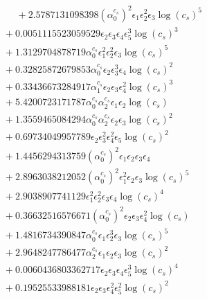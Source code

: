 \documentclass[10pt]{article}
\begin{document}
\begin{align*}
\phantom{F_{s,6}} &\phantom{={}}{}  + 2.5787131098398 \left(\alpha_{0}^{c_s}\right)^{2} \epsilon_{1} \epsilon_{2}^{2} \epsilon_{3} \log{\left(c_{s} \right)}^{5} \\
&{}  + 0.0051115523059529 \epsilon_{2} \epsilon_{3} \epsilon_{4} \epsilon_{5}^{3} \log{\left(c_{s} \right)}^{3} \\
&{}  + 1.3129704878719 \alpha_{0}^{c_s} \epsilon_{1}^{2} \epsilon_{2}^{2} \epsilon_{3} \log{\left(c_{s} \right)}^{5} \\
&{}  + 0.32825872679853 \alpha_{0}^{c_s} \epsilon_{2} \epsilon_{3}^{3} \epsilon_{4} \log{\left(c_{s} \right)}^{2} \\
&{}  + 0.33436673284917 \alpha_{1}^{c_s} \epsilon_{2} \epsilon_{3} \epsilon_{4}^{2} \log{\left(c_{s} \right)}^{3} \\
&{}  + 5.4200723171787 \alpha_{0}^{c_s} \alpha_{2}^{c_s} \epsilon_{1} \epsilon_{2} \log{\left(c_{s} \right)} \\
&{}  + 1.3559465084294 \alpha_{0}^{c_s} \alpha_{2}^{c_s} \epsilon_{2} \epsilon_{3} \log{\left(c_{s} \right)}^{2} \\
&{}  + 0.69734049957789 \epsilon_{2} \epsilon_{3}^{2} \epsilon_{4}^{2} \epsilon_{5} \log{\left(c_{s} \right)}^{2} \\
&{}  + 1.4456294313759 \left(\alpha_{0}^{c_s}\right)^{2} \epsilon_{1} \epsilon_{2} \epsilon_{3} \epsilon_{4} \\
&{}  + 2.8963038212052 \left(\alpha_{0}^{c_s}\right)^{2} \epsilon_{1}^{2} \epsilon_{2} \epsilon_{3} \log{\left(c_{s} \right)}^{5} \\
&{}  + 2.9038907741129 \epsilon_{1}^{2} \epsilon_{2}^{2} \epsilon_{3} \epsilon_{4} \log{\left(c_{s} \right)}^{4} \\
&{}  + 0.36632516576671 \left(\alpha_{0}^{c_s}\right)^{2} \epsilon_{2} \epsilon_{3} \epsilon_{4}^{2} \log{\left(c_{s} \right)} \\
&{}  + 1.4816734390847 \alpha_{0}^{c_s} \epsilon_{1} \epsilon_{2}^{3} \epsilon_{3} \log{\left(c_{s} \right)}^{5} \\
&{}  + 2.9648247786477 \alpha_{2}^{c_s} \epsilon_{1} \epsilon_{2} \epsilon_{3} \log{\left(c_{s} \right)}^{2} \\
&{}  + 0.0060436803362717 \epsilon_{2} \epsilon_{3} \epsilon_{4} \epsilon_{5}^{3} \log{\left(c_{s} \right)}^{4} \\
&{}  + 0.19525533988181 \epsilon_{2} \epsilon_{3} \epsilon_{4}^{2} \epsilon_{5}^{2} \log{\left(c_{s} \right)}^{2} \\

\end{align*}
\end{document}
